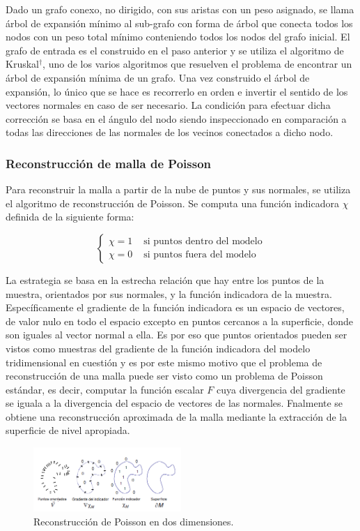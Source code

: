Dado un grafo conexo, no dirigido, con sus aristas con un peso asignado, se llama árbol de expansión mínimo al sub-grafo con forma de árbol que conecta todos los nodos con un peso total mínimo conteniendo todos los nodos del grafo inicial. El grafo de entrada es el construido en el paso anterior y se utiliza el algoritmo de Kruskal$^\dagger$, uno de los varios algoritmos que resuelven el problema de encontrar un árbol de expansión mínima de un grafo.
Una vez construido el árbol de expansión, lo único que se hace es recorrerlo en orden e invertir el sentido de los vectores normales en caso de ser necesario. La condición para efectuar dicha corrección se basa en el ángulo del nodo siendo inspeccionado en comparación a todas las direcciones de las normales de los vecinos conectados a dicho nodo.

\subsubsection{Reconstrucción de malla de Poisson}

Para reconstruir la malla a partir de la nube de puntos y sus normales, se utiliza el algoritmo de reconstrucción de Poisson\cite{PoissonSR}.
Se computa una función indicadora $\chi$ definida de la siguiente forma:

$$
\left\{ \begin{array}{rl}
 \chi = 1 & \mbox{ si puntos dentro del modelo} \\
 \chi = 0 & \mbox{ si puntos fuera del modelo}
       \end{array} \right.
$$

La estrategia se basa en la estrecha relación que hay entre los puntos de la muestra, orientados por sus normales, y la función indicadora de la muestra. Específicamente el gradiente de la función indicadora es un espacio de vectores, de valor nulo en todo el espacio excepto en puntos cercanos a la superficie, donde son iguales al vector normal a ella.
Es por eso que puntos orientados pueden ser vistos como muestras del gradiente de la función indicadora del modelo tridimensional en cuestión y es por este mismo motivo que el problema de reconstrucción de una malla puede ser visto como un problema de Poisson estándar, es decir, computar la función escalar $F$ cuya divergencia del gradiente se iguala a la divergencia del espacio de vectores de las normales. Fnalmente se obtiene una reconstrucción aproximada de la malla mediante la extracción de la superficie de nivel apropiada.

\begin{figure}[H]
  \centering
    \includegraphics[width=0.5\textwidth]{./Cap2_videomapping/poisson2d.png}
  \caption[Poisson Surface Reconstruction, Michael Kazhdan, Matthew Bolitho and Hugues Hoppe Fig.1]{Reconstrucción de Poisson en dos dimensiones.}
  \label{fig:Reconstruction-Poisson}
\end{figure}
